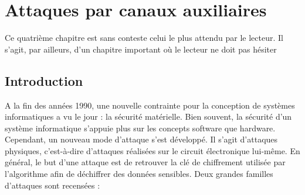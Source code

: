 \documentclass[oneside]{book}
\begin{document}
\newpage


\chapter{Attaques par canaux auxiliaires}
\label{chap:attaques}

Ce quatrième chapitre est sans conteste celui le plus attendu par le lecteur. Il s'agit, par ailleurs, d'un chapitre important où le lecteur ne doit pas hésiter 
\section{Introduction}
\label{sec:att}

\vspace{-0.1 cm}A la fin des années 1990, une nouvelle contrainte pour la conception de systèmes informatiques a vu le jour : la sécurité matérielle. Bien souvent, la sécurité d'un système informatique s'appuie plus sur les concepts software que hardware. Cependant, un nouveau mode d'attaque s'est développé. Il s'agit d'attaques physiques, c'est-à-dire d'attaques réalisées sur le circuit électronique lui-même. En général, le but d'une attaque est de retrouver la clé de chiffrement utilisée par l'algorithme afin de déchiffrer des données sensibles. Deux grandes familles d'attaques sont recensées : 
\end{document}
